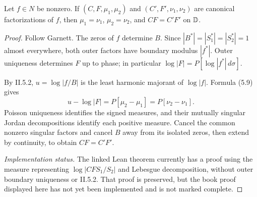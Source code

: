\begin{theorem}
  \label{thm:nevanlinna_factorization_uniqueness}
  \leanok
  \mainline
  Let $f\in N$ be nonzero. If $(C,F,\mu_1,\mu_2)$ and
  $(C',F',\nu_1,\nu_2)$ are canonical factorizations of $f$, then
  $\mu_1=\nu_1$, $\mu_2=\nu_2$, and $CF=C'F'$ on $\mathbb{D}$.
  \begin{proof}
    \leanok
    Follow Garnett. The zeros of $f$ determine $B$. Since
    $|B^*|=|S_1^*|=|S_2^*|=1$ almost everywhere, both outer factors have
    boundary modulus $|f^*|$. Outer uniqueness determines $F$ up to phase;
    in particular $\log|F|=P[\log|f^*|\,d\sigma]$.

    By II.5.2, $u=\log|f/B|$ is the least harmonic majorant of $\log|f|$.
    Formula (5.9) gives
    \[
      u-\log|F|=P[\mu_2-\mu_1]=P[\nu_2-\nu_1].
    \]
    Poisson uniqueness identifies the signed measures, and their mutually
    singular Jordan decompositions identify each positive measure.
    Cancel the common nonzero singular factors and cancel $B$ away from
    its isolated zeros, then extend by continuity, to obtain $CF=C'F'$.

    \emph{Implementation status.} The linked Lean theorem currently has a
    proof using the measure representing $\log|CFS_1/S_2|$ and Lebesgue
    decomposition, without outer boundary uniqueness or II.5.2. That proof
    is preserved, but the book proof displayed here has not yet been
    implemented and is not marked complete.
  \end{proof}
\end{theorem}

